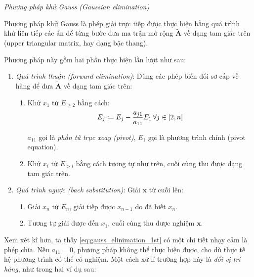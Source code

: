 \documentclass[../../Lectures]{subfiles}
\begin{document}
\begin{method}\label{method:gauss_elimination}
    \emph{Phương pháp khử Gauss (Gaussian elimination)}

    Phương pháp khử Gauss là phép giải trực tiếp được thực hiện bằng quá trình
    khử liên tiếp các ẩn để từng bước đưa ma trận mở rộng \(\bm{\tilde{A}}\) về
    dạng tam giác trên (upper triangular matrix, hay dạng bậc thang).

    Phương pháp này gồm hai phần thực hiện lần lượt như sau:

    \begin{enumerate}
        \item \emph{Quá trình thuận (forward elimination)}: Dùng các phép biến
            đổi sơ cấp về hàng để đưa \(\bm{\tilde{A}}\) về dạng tam giác trên:
            \begin{enumerate}
                \item Khử \(x_1\) từ \(E_{\geq 2}\) bằng cách:
                    \begin{equation}\label{eq:gauss_elinimation_1st}
                        E_j \coloneqq E_j - \frac{a_{j1}}{a_{11}} E_1 \, \forall j \in \interval{2}{n}
                    \end{equation}

                    \(a_{11}\) gọi là \emph{phần tử trục xoay (pivot)}, \(E_1\)
                    gọi là phương trình chính (pivot equation).

                \item Khử \(x_i\) từ \(E_{> i}\) bằng cách tương tự như trên,
                    cuối cùng thu được dạng tam giác trên.
            \end{enumerate}

        \item \emph{Quá trình ngược (back substitution)}: Giải \(\bm{x}\) từ
            cuối lên:
            \begin{enumerate}
                \item Giải \(x_n\) từ \(E_n\), giải tiếp được \(x_{n - 1}\) do
                    đã biết \(x_n\).

                \item Tương tự giải được đến \(x_1\), cuối cùng thu được nghiệm
                    \(\bm{x}\).
            \end{enumerate}
    \end{enumerate}
\end{method}

Xem xét kĩ hơn, ta thấy \eqref{eq:gauss_elinimation_1st} có một chi tiết nhạy
cảm là phép chia. Nếu \(a_{11} = 0\), phương pháp không thể thực hiện được, cho
dù thực tế hệ phương trình có thể có nghiệm. Một cách xử lí trường hợp này là
\emph{đổi vị trí hàng}, như trong hai ví dụ sau:
\end{document}
